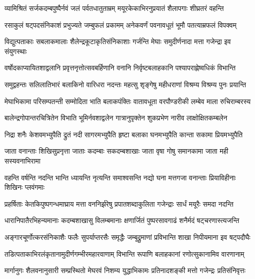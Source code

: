 \twolineshloka
{व्यामिश्रितं सर्जकदम्बपुष्पैर्नवं जलं पर्वतधातुताम्रम्}
{मयूरकेकाभिरनुप्रयातं शैलापगाः शीघ्रतरं वहन्ति} %

\twolineshloka
{रसाकुलं षट्पदसंनिकाशं प्रभुज्यते जम्बुफलं प्रकामम्}
{अनेकवर्णं पवनावधूतं भूमौ पतत्याम्रफलं विपक्वम्} %

\twolineshloka
{विद्युत्पताकाः सबलाकमालाः शैलेन्द्रकूटाकृतिसंनिकाशाः}
{गर्जन्ति मेघाः समुदीर्णनादा मत्ता गजेन्द्रा इव संयुगस्थाः} %

\twolineshloka
{वर्षोदकाप्यायितशाद्वलानि प्रवृत्तनृत्तोत्सवबर्हिणानि}
{वनानि निर्वृष्टबलाहकानि पश्यापराह्णेष्वधिकं विभान्ति} %

\twolineshloka
{समुद्वहन्तः सलिलातिभारं बलाकिनो वारिधरा नदन्तः}
{महत्सु शृङ्गेषु महीधराणां विश्रम्य विश्रम्य पुनः प्रयान्ति} %

\twolineshloka
{मेघाभिकामा परिसम्पतन्ती सम्मोदिता भाति बलाकपंक्तिः}
{वातावधूता वरपौण्डरीकी लम्बेव माला रुचिराम्बरस्य} %

\twolineshloka
{बालेन्द्रगोपान्तरचित्रितेन विभाति भूमिर्नवशाद्वलेन}
{गात्रानुपृक्तेन शुकप्रभेण नारीव लाक्षोक्षितकम्बलेन} %

\twolineshloka
{निद्रा शनैः केशवमभ्युपैति द्रुतं नदी सागरमभ्युपैति}
{हृष्टा बलाका घनमभ्युपैति कान्ता सकामा प्रियमभ्युपैति} %

\twolineshloka
{जाता वनान्ताः शिखिसुप्रनृत्ता जाताः कदम्बाः सकदम्बशाखाः}
{जाता वृषा गोषु समानकामा जाता मही सस्यवनाभिरामा} %

\twolineshloka
{वहन्ति वर्षन्ति नदन्ति भान्ति ध्यायन्ति नृत्यन्ति समाश्वसन्ति}
{नद्यो घना मत्तगजा वनान्ताः प्रियाविहीनाः शिखिनः प्लवंगमाः} %

\twolineshloka
{प्रहर्षिताः केतकिपुष्पगन्धमाघ्राय मत्ता वननिर्झरेषु}
{प्रपातशब्दाकुलिता गजेन्द्राः सार्धं मयूरैः समदा नदन्ति} %

\twolineshloka
{धारानिपातैरभिहन्यमानाः कदम्बशाखासु विलम्बमानाः}
{क्षणार्जितं पुष्परसावगाढं शनैर्मदं षट्चरणास्त्यजन्ति} %

\twolineshloka
{अङ्गारचूर्णोत्करसंनिकाशैः फलैः सुपर्याप्तरसैः समृद्धैः}
{जम्बूद्रुमाणां प्रविभान्ति शाखा निपीयमाना इव षट्पदौघैः} %

\twolineshloka
{तडित्पताकाभिरलंकृतानामुदीर्णगम्भीरमहारवाणाम्}
{विभान्ति रूपाणि बलाहकानां रणोत्सुकानामिव वारणानाम्} %

\twolineshloka
{मार्गानुगः शैलवनानुसारी सम्प्रस्थितो मेघरवं निशम्य}
{युद्धाभिकामः प्रतिनादशङ्की मत्तो गजेन्द्रः प्रतिसंनिवृत्तः} %

